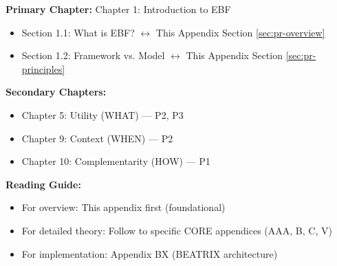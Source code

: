 %
%

%
%
%
%

\begin{tcolorbox}[colback=purple!5!white, colframe=purple!75!black,
    title=Chapter Linkage]

\textbf{Primary Chapter:} Chapter 1: Introduction to EBF
\begin{itemize}[nosep]
\item Section 1.1: What is EBF? $\leftrightarrow$ This Appendix Section \ref{sec:pr-overview}
\item Section 1.2: Framework vs. Model $\leftrightarrow$ This Appendix Section \ref{sec:pr-principles}
\end{itemize}

\textbf{Secondary Chapters:}
\begin{itemize}[nosep]
\item Chapter 5: Utility (WHAT) --- P2, P3
\item Chapter 9: Context (WHEN) --- P2
\item Chapter 10: Complementarity (HOW) --- P1
\end{itemize}

\textbf{Reading Guide:}
\begin{itemize}[nosep]
\item For overview: This appendix first (foundational)
\item For detailed theory: Follow to specific CORE appendices (AAA, B, C, V)
\item For implementation: Appendix BX (BEATRIX architecture)
\end{itemize}

\end{tcolorbox}

